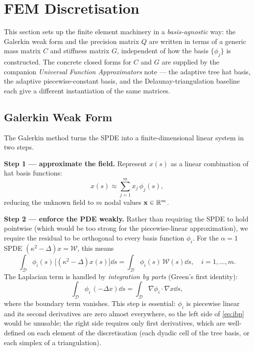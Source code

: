\documentclass[11pt]{article}
\begin{document}
\section{FEM Discretisation}

This section sets up the finite element machinery in a \emph{basis-agnostic}
way: the Galerkin weak form and the precision matrix $Q$ are written in terms of
a generic mass matrix $C$ and stiffness matrix $G$, independent of how the basis
$\{\phi_j\}$ is constructed.  The concrete closed forms for $C$ and $G$ are
supplied by the companion \emph{Universal Function Approximators} note --- the
adaptive tree hat basis, the adaptive piecewise-constant basis, and the
Delaunay-triangulation baseline each give a different instantiation of the same
matrices.

\subsection{Galerkin Weak Form}
\label{sec:galerkin}

The Galerkin method turns the SPDE into a finite-dimensional linear system
in two steps.

\textbf{Step 1 --- approximate the field.}  Represent $x(s)$ as a linear
combination of hat basis functions:
\begin{equation}
  x(s) \approx \sum_{j=1}^m x_j\,\phi_j(s),
  \label{eq:fem-approx}
\end{equation}
reducing the unknown field to $m$ nodal values $\mathbf{x}\in\mathbb{R}^m$.

\textbf{Step 2 --- enforce the PDE weakly.}  Rather than requiring the SPDE
to hold pointwise (which would be too strong for the piecewise-linear
approximation), we require the residual to be orthogonal to every basis
function $\phi_i$.  For the $\alpha=1$ SPDE
$(\kappa^2-\Delta)x=\mathcal{W}$, this means
\begin{equation}
  \int_\mathcal{D} \phi_i(s)\,\bigl[(\kappa^2-\Delta)x(s)\bigr]\dd s
  = \int_\mathcal{D} \phi_i(s)\,\mathcal{W}(s)\dd s, \quad i=1,\ldots,m.
  \label{eq:galerkin-condition}
\end{equation}
The Laplacian term is handled by \emph{integration by parts}
(Green's first identity):
\begin{equation}
  \int_\mathcal{D} \phi_i\,(-\Delta x)\dd s
  = \int_\mathcal{D} \nabla\phi_i\cdot\nabla x\dd s,
  \label{eq:ibp}
\end{equation}
where the boundary term vanishes.  This step is essential: $\phi_i$ is
piecewise linear and its second derivatives are zero almost everywhere, so the
left side of \eqref{eq:ibp} would be unusable; the right side requires only
first derivatives, which are well-defined on each element of the discretisation
(each dyadic cell of the tree basis, or each simplex of a triangulation).
\end{document}
